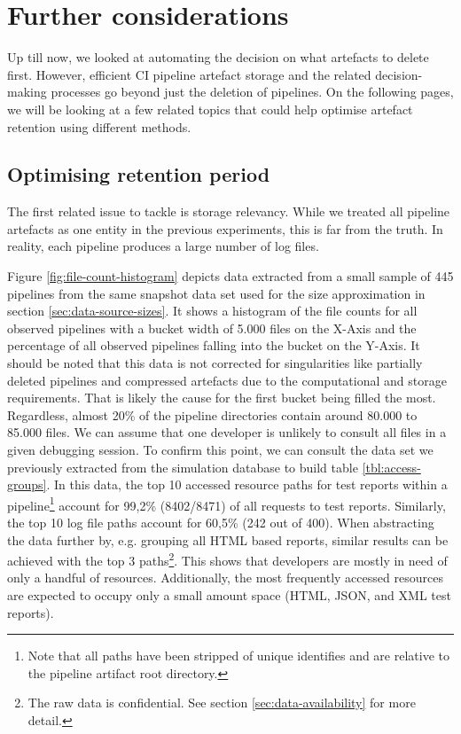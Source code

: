 \section{Further considerations}\label{sec:further-considerations}
    Up till now, we looked at automating the decision on what artefacts to delete first. However, efficient CI pipeline artefact storage and the related decision-making processes go beyond just the deletion of pipelines. On the following pages, we will be looking at a few related topics that could help optimise artefact retention using different methods.
    
    \subsection{Optimising retention period}
        The first related issue to tackle is storage relevancy. While we treated all pipeline artefacts as one entity in the previous experiments, this is far from the truth. In reality, each pipeline produces a large number of log files.
        
        
        Figure \ref{fig:file-count-histogram} depicts data extracted from a small sample of 445 pipelines from the same snapshot data set used for the size approximation in section \ref{sec:data-source-sizes}. It shows a histogram of the file counts for all observed pipelines with a bucket width of 5.000 files on the X-Axis and the percentage of all observed pipelines falling into the bucket on the Y-Axis. It should be noted that this data is not corrected for singularities like partially deleted pipelines and compressed artefacts due to the computational and storage requirements. That is likely the cause for the first bucket being filled the most. Regardless, almost 20\% of the pipeline directories contain around 80.000 to 85.000 files. We can assume that one developer is unlikely to consult all files in a given debugging session. To confirm this point, we can consult the data set we previously extracted from the simulation database to build table \ref{tbl:access-groups}. In this data, the top 10 accessed resource paths for test reports within a pipeline\footnote{Note that all paths have been stripped of unique identifies and are relative to the pipeline artifact root directory.} account for 99,2\% (8402/8471) of all requests to test reports. Similarly, the top 10 log file paths account for 60,5\% (242 out of 400). When abstracting the data further by, e.g. grouping all HTML based reports, similar results can be achieved with the top 3 paths\footnote{The raw data is confidential. See section \ref{sec:data-availability} for more detail.}. This shows that developers are mostly in need of only a handful of resources. Additionally, the most frequently accessed resources are expected to occupy only a small amount space (HTML, JSON, and XML test reports).
        
